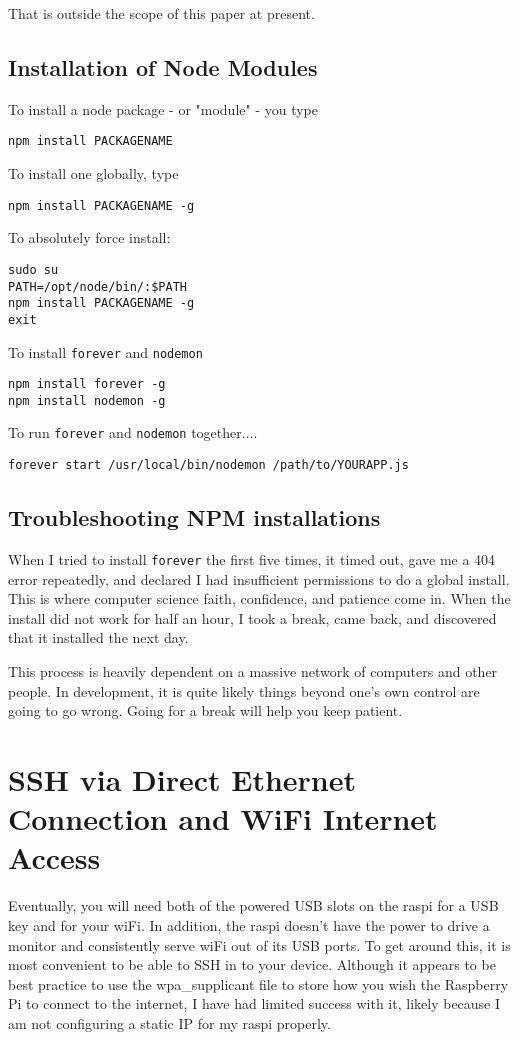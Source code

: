 That is outside the scope of this paper at present. 

\subsection{Installation of Node Modules}
To install a node package - or "module" - you type 

\begin{lstlisting}
npm install PACKAGENAME
\end{lstlisting}

To install one globally, type
\begin{lstlisting}
npm install PACKAGENAME -g
\end{lstlisting}


To absolutely force install:
\begin{lstlisting}
sudo su
PATH=/opt/node/bin/:$PATH
npm install PACKAGENAME -g
exit
\end{lstlisting}

To install \texttt{forever} and \texttt{nodemon}
\begin{lstlisting}
npm install forever -g
npm install nodemon -g
\end{lstlisting}

To run \texttt{forever} and \texttt{nodemon} together....
\begin{lstlisting}
forever start /usr/local/bin/nodemon /path/to/YOURAPP.js
\end{lstlisting}

\subsection{Troubleshooting NPM installations}
When I tried to install \texttt{forever} the first five times, it timed out, gave me a 404 error repeatedly, and declared I had insufficient permissions to do a global install. This is where computer science faith, confidence, and patience come in. When the install did not work for half an hour, I took a break, came back, and discovered that it installed the next day.

This process is heavily dependent on a massive network of computers and other people. In development, it is quite likely things beyond one's own control are going to go wrong. Going for a break will help you keep patient.

\section{SSH via Direct Ethernet Connection and WiFi Internet Access}
Eventually, you will need both of the powered USB slots on the raspi for a USB key and for your wiFi. In addition, the raspi doesn't have the power to drive a monitor and consistently serve wiFi out of its USB ports. To get around this, it is most convenient to be able to SSH in to your device. Although it appears to be best practice to use the wpa_supplicant file to store how you wish the Raspberry Pi to connect to the internet, I have had limited success with it, likely because I am not configuring a static IP for my raspi properly.

